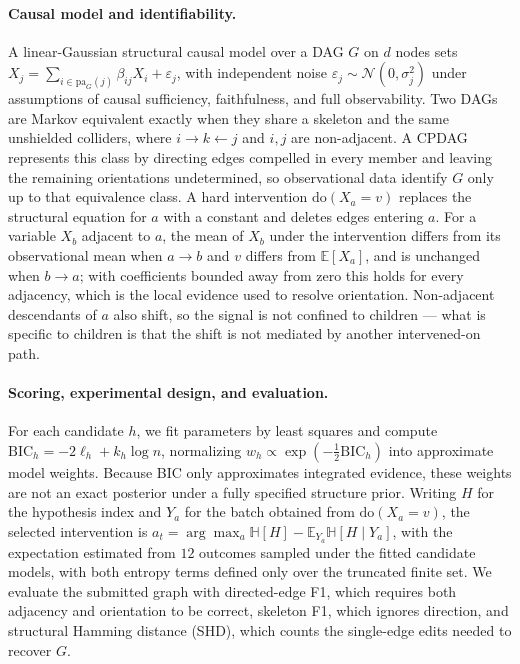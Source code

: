 \documentclass{article}
\begin{document}
\paragraph{Causal model and identifiability.}
A linear-Gaussian structural causal model over a DAG $G$ on $d$ nodes sets
$X_j = \sum_{i \in \mathrm{pa}_G(j)} \beta_{ij}X_i + \varepsilon_j$, with independent noise
$\varepsilon_j \sim \mathcal{N}(0,\sigma_j^2)$ under assumptions of causal sufficiency,
faithfulness, and full observability. Two DAGs are Markov equivalent exactly when they share a
skeleton and the same
unshielded colliders, where $i \to k \leftarrow j$ and $i,j$ are non-adjacent. A CPDAG represents
this class by directing edges compelled in every member and leaving the remaining orientations
undetermined, so observational data identify $G$ only up to that equivalence class. A hard
intervention $\mathrm{do}(X_a=v)$ replaces the structural equation for $a$ with a constant and
deletes edges entering $a$. For a variable $X_b$ adjacent to $a$, the mean of $X_b$ under the
intervention differs from its observational mean when $a \to b$ and $v$ differs from
$\mathbb{E}[X_a]$, and is unchanged when $b \to a$; with coefficients bounded away from zero this
holds for every adjacency, which is the local evidence used to resolve orientation. Non-adjacent
descendants of $a$ also shift, so the signal is not confined to children --- what is specific to
children is that the shift is not mediated by another intervened-on path.

\paragraph{Scoring, experimental design, and evaluation.}
For each candidate $h$, we fit parameters by least squares and compute
$\mathrm{BIC}_h=-2\ell_h+k_h\log n$, normalizing
$w_h \propto \exp(-\tfrac12\mathrm{BIC}_h)$ into approximate model weights. Because BIC only
approximates integrated evidence, these weights are not an exact posterior under a fully specified
structure prior. Writing $H$ for the hypothesis index and $Y_a$ for the batch obtained from
$\mathrm{do}(X_a=v)$, the selected intervention is
$a_t=\arg\max_a \mathbb{H}[H]-\mathbb{E}_{Y_a}\mathbb{H}[H\mid Y_a]$, with the expectation
estimated from $12$ outcomes sampled under the fitted candidate models, with both entropy terms
defined only over the truncated finite set. We evaluate the submitted graph with directed-edge F1, which
requires both adjacency and orientation to be correct, skeleton F1, which ignores direction, and
structural Hamming distance (SHD), which counts the single-edge edits needed to recover $G$.
\end{document}
